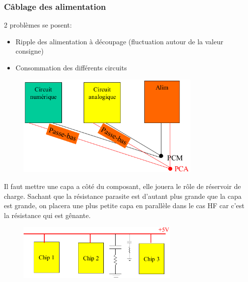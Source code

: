 \subsubsection{Câblage des alimentation}
2 problèmes se posent:
\begin{itemize}
	\item Ripple des alimentation à découpage (fluctuation autour de la valeur consigne)
	\item Consommation des différents circuits
\end{itemize}
\begin{figure}[H] 
	\centering 
	\includegraphics[width=0.8\textwidth,height=10\baselineskip,keepaspectratio]{ch3/image33}  
\end{figure}
Il faut mettre une capa a côté du composant, elle jouera le rôle de réservoir de charge. Sachant que la résistance parasite est d'autant plus grande que la capa est grande, on placera une plus petite capa en parallèle dans le cas HF car c'est la résistance qui est gênante.
\begin{figure}[H] 
	\centering 
	\includegraphics[width=0.7\textwidth,height=10\baselineskip,keepaspectratio]{ch3/image34}  
\end{figure}
